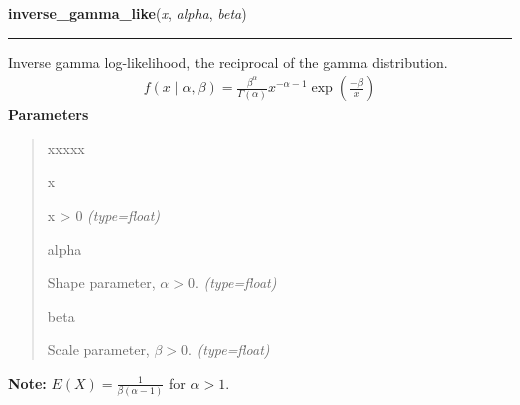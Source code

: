     \label{pymc:distributions:inverse_gamma_like}

    \vspace{0.5ex}

\hspace{.8\funcindent}\begin{boxedminipage}{\funcwidth}

    \raggedright \textbf{inverse\_gamma\_like}(\textit{x}, \textit{alpha}, \textit{beta})

    \vspace{-1.5ex}

    \rule{\textwidth}{0.5\fboxrule}
\setlength{\parskip}{2ex}

Inverse gamma log-likelihood, the reciprocal of the gamma distribution.
\begin{equation*}\begin{split}f(x \mid \alpha, \beta) = \frac{\beta^{\alpha}}{\Gamma(\alpha)} x^{-\alpha - 1} \exp\left(\frac{-\beta}{x}\right)\end{split}\end{equation*}\setlength{\parskip}{1ex}
      \textbf{Parameters}
      \vspace{-1ex}

      \begin{quote}
        \begin{Ventry}{xxxxx}

          \item[x]


x {\textgreater} 0
            {\it (type=float)}

          \item[alpha]


Shape parameter, $\alpha > 0$.
            {\it (type=float)}

          \item[beta]


Scale parameter, $\beta > 0$.
            {\it (type=float)}

        \end{Ventry}

      \end{quote}

\textbf{Note:} 
$E(X)=\frac{1}{\beta(\alpha-1)}$  for $\alpha > 1$.


    \end{boxedminipage}

    \label{pymc:distributions:lognormal_like}

